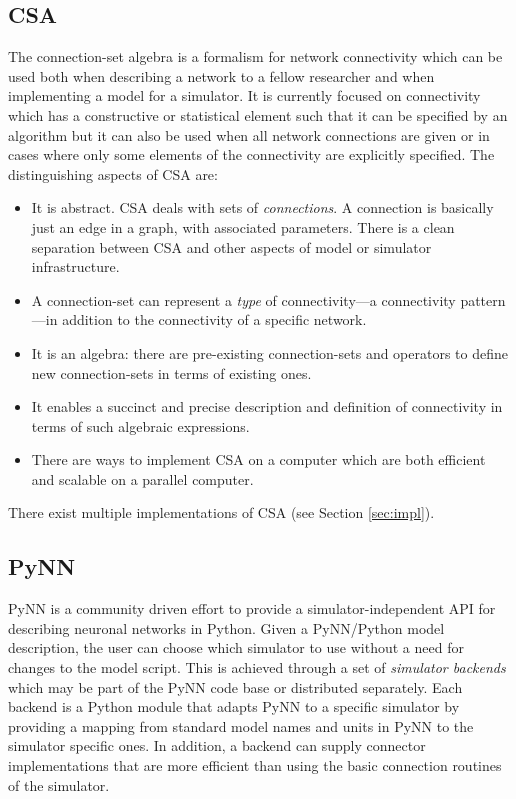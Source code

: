 \documentclass{frontiersSCNS} %
\begin{document}
\subsection{CSA}
The connection-set algebra \citep[CSA;][]{djurfeldt12} is a formalism
for network connectivity which can be used both when describing a
network to a fellow researcher and when implementing a model for a
simulator.  It is currently focused on connectivity which has a
constructive or statistical element such that it can be specified by
an algorithm but it can also be used when all network connections are
given or in cases where only some elements of the connectivity are
explicitly specified. The distinguishing aspects of CSA are:
\begin{itemize}
\item It is abstract. CSA deals with sets of \emph{connections}. A
  connection is basically just an edge in a graph, with associated
  parameters. There is a clean separation between CSA and other
  aspects of model or simulator infrastructure.
\item A connection-set can represent a \emph{type} of
  connectivity---a connectivity pattern---in addition to the connectivity
  of a specific network.
\item It is an algebra: there are pre-existing connection-sets and
  operators to define new connection-sets in terms of existing ones.
\item It enables a succinct and precise description and definition of
  connectivity in terms of such algebraic expressions.
\item There are ways to implement CSA on a computer which are both
  efficient and scalable on a parallel computer.
\end{itemize}
There exist multiple implementations of CSA (see Section
\ref{sec:impl}).

\subsection{PyNN}\label{sec:pynn}

PyNN \citep[\url{http://www.neuralensemble.org/PyNN};][]{Davison09} is
a community driven effort to provide a simulator-independent API for
describing neuronal networks in Python. Given a PyNN/Python model
description, the user can choose which simulator to use without a need
for changes to the model script. This is achieved through a set of
\emph{simulator backends} which may be part of the PyNN code base or
distributed separately. Each backend is a Python module that adapts
PyNN to a specific simulator by providing a mapping from standard
model names and units in PyNN to the simulator specific ones. In
addition, a backend can supply connector implementations that are more
efficient than using the basic connection routines of the simulator.
\end{document}
